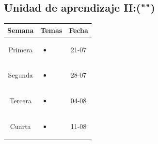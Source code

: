 \documentclass[a4paper]{article}
\begin{document}
\subsection{Unidad de aprendizaje II:("")}
\begin{table}[ht]
\centering
\begin{tabular}{|c|c|c|}
\hline
\textbf{Semana} & \textbf{Temas} & \textbf{Fecha} \\ 
\hline
Primera 
& \begin{minipage}[t]{10cm}
\begin{itemize}
\item 
\end{itemize}
\end{minipage} & 21-07\\ 
\hline 
Segunda 
& \begin{minipage}[t]{10cm}
\begin{itemize}
\item 
\end{itemize}
\end{minipage} & 28-07\\ 
\hline 
Tercera 
& \begin{minipage}[t]{10cm}
\begin{itemize}
\item 
\end{itemize}
\end{minipage} & 04-08 \\ 
\hline 
Cuarta 
& \begin{minipage}[t]{10cm}
\begin{itemize}
\item 
\end{itemize}
\end{minipage} & 11-08 \\ 
\hline 
\end{tabular}
\end{table}
\newpage
\end{document}
